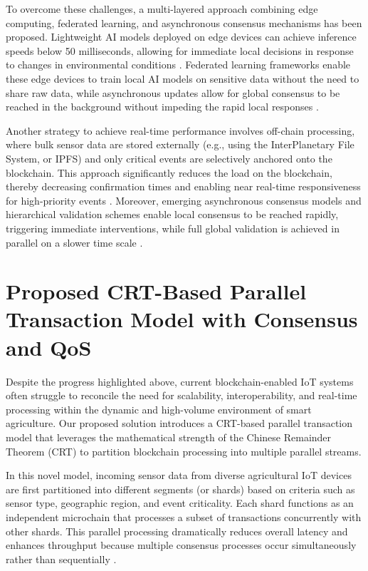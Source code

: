 \documentclass[12pt,onecolumn]{IEEEtran} %
\begin{document}
To overcome these challenges, a multi-layered approach combining edge computing, federated learning, and asynchronous consensus mechanisms has been proposed. Lightweight AI models deployed on edge devices can achieve inference speeds below 50 milliseconds, allowing for immediate local decisions in response to changes in environmental conditions \cite{huang2025digitaltraceabilityin, huang2025digitaltraceabilityin}. Federated learning frameworks enable these edge devices to train local AI models on sensitive data without the need to share raw data, while asynchronous updates allow for global consensus to be reached in the background without impeding the rapid local responses \cite{huang2025digitaltraceabilityin}.

Another strategy to achieve real-time performance involves off-chain processing, where bulk sensor data are stored externally (e.g., using the InterPlanetary File System, or IPFS) and only critical events are selectively anchored onto the blockchain. This approach significantly reduces the load on the blockchain, thereby decreasing confirmation times and enabling near real-time responsiveness for high-priority events \cite{huang2025digitaltraceabilityin, huang2025digitaltraceabilityin}. Moreover, emerging asynchronous consensus models and hierarchical validation schemes enable local consensus to be reached rapidly, triggering immediate interventions, while full global validation is achieved in parallel on a slower time scale \cite{huang2025digitaltraceabilityin, huang2025digitaltraceabilityin}.

\section{Proposed CRT-Based Parallel Transaction Model with Consensus and QoS}\label{sec:crt-model}
Despite the progress highlighted above, current blockchain-enabled IoT systems often struggle to reconcile the need for scalability, interoperability, and real-time processing within the dynamic and high-volume environment of smart agriculture. Our proposed solution introduces a CRT-based parallel transaction model that leverages the mathematical strength of the Chinese Remainder Theorem (CRT) to partition blockchain processing into multiple parallel streams.

In this novel model, incoming sensor data from diverse agricultural IoT devices are first partitioned into different segments (or shards) based on criteria such as sensor type, geographic region, and event criticality. Each shard functions as an independent microchain that processes a subset of transactions concurrently with other shards. This parallel processing dramatically reduces overall latency and enhances throughput because multiple consensus processes occur simultaneously rather than sequentially \cite{thiruvenkatasamy2025anonlinetool, hussein2024aiandiot}.
\end{document}
